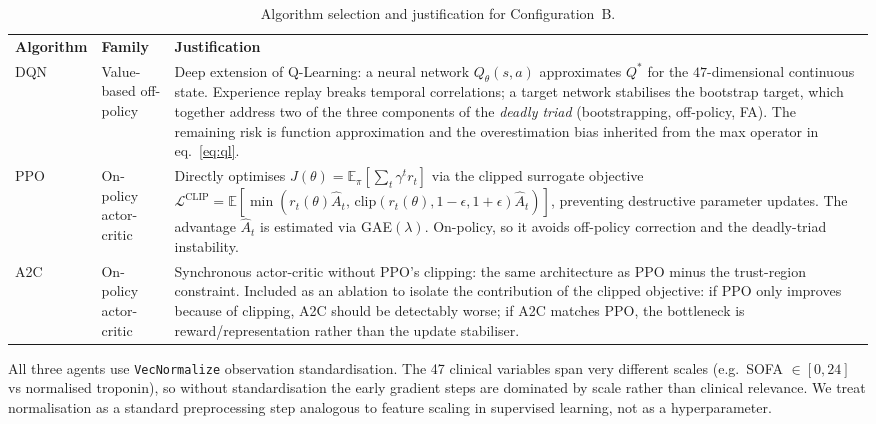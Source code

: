 \documentclass[11pt,a4paper]{article}
\newcommand{\tH}[1]{\textcolor{novagreen}{\textbf{#1}}}
\newcommand{\gmid}{\arrayrulecolor{novagreen}\midrule\arrayrulecolor{black}}
\begin{document}
\begin{table}[H]
\centering
\begin{tabularx}{\textwidth}{>{\raggedright\arraybackslash}p{}
                             >{\raggedright\arraybackslash}p{}X}
\toprule
\tH{Algorithm} & \tH{Family} & \tH{Justification} \\
\gmid
DQN \cite{mnih2015} & Value-based off-policy &
  Deep extension of Q-Learning: a neural network $Q_\theta(s,a)$ approximates
  $Q^*$ for the $47$-dimensional continuous state. Experience replay breaks
  temporal correlations; a target network stabilises the bootstrap target, which
  together address two of the three components of the \emph{deadly triad}
  (bootstrapping, off-policy, FA). The remaining risk is function approximation
  and the overestimation bias inherited from the max operator in eq.~\ref{eq:ql}. \\
PPO \cite{schulman2017} & On-policy actor-critic &
  Directly optimises $J(\theta)=\mathbb{E}_\pi[\sum_t\gamma^t r_t]$ via the
  clipped surrogate objective $\mathcal{L}^{\mathrm{CLIP}}=
  \mathbb{E}[\min(r_t(\theta)\hat{A}_t,\,
  \mathrm{clip}(r_t(\theta),1{-}\epsilon,1{+}\epsilon)\hat{A}_t)]$, preventing
  destructive parameter updates. The advantage $\hat{A}_t$ is estimated via
  GAE$(\lambda)$. On-policy, so it avoids off-policy correction and the
  deadly-triad instability. \\
A2C \cite{mnih2016} & On-policy actor-critic &
  Synchronous actor-critic without PPO's clipping: the same architecture as PPO
  minus the trust-region constraint. Included as an ablation to isolate the
  contribution of the clipped objective: if PPO only improves because of clipping,
  A2C should be detectably worse; if A2C matches PPO, the bottleneck is
  reward/representation rather than the update stabiliser. \\
\bottomrule
\end{tabularx}
\caption{Algorithm selection and justification for Configuration~B.}
\label{tab:algojust_b}
\end{table}

All three agents use \texttt{VecNormalize} observation standardisation. The 47
clinical variables span very different scales (e.g.\ SOFA $\in[0,24]$ vs
normalised troponin), so without standardisation the early gradient steps are
dominated by scale rather than clinical relevance. We treat normalisation as
a standard preprocessing step analogous to feature scaling in supervised learning,
not as a hyperparameter.
\end{document}
